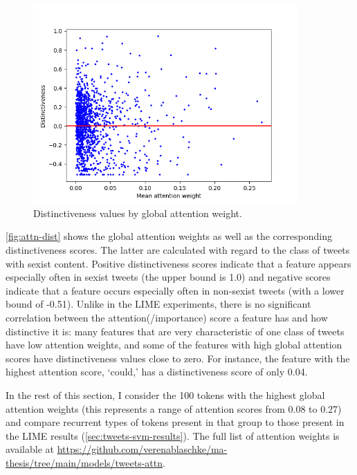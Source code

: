 \begin{figure}[htbp]
    \centering
    \includegraphics[width=0.9\textwidth]{figures/3-dialects/attention-distinctiveness.png}
    \caption[Distinctiveness values by attention weight for features in the Twitter data]{Distinctiveness values by global attention weight.}
    \label{fig:attn-dist}
\end{figure}

\autoref{fig:attn-dist} shows the global attention weights as well as the corresponding distinctiveness scores.
The latter are calculated with regard to the class of tweets with sexist content.
Positive distinctiveness scores indicate that a feature appears especially often in sexist tweets (the upper bound is 1.0) and negative scores indicate that a feature occurs especially often in non-sexist tweets (with a lower bound of -0.51).
Unlike in the LIME experiments, there is no significant correlation between the attention(/importance) score a feature has and how distinctive it is: many features that are very characteristic of one class of tweets have low attention weights, and some of the features with high global attention scores have distinctiveness values close to zero.
For instance, the feature with the highest attention score,  `could,' has a distinctiveness score of only 0.04.

In the rest of this section, I consider the 100 tokens with the highest global attention weights (this represents a range of attention scores from 0.08 to 0.27) and compare recurrent types of tokens present in that group to those present in the LIME results (\autoref{sec:tweets-svm-results}).
The full list of attention weights is available at \url{https://github.com/verenablaschke/ma-thesis/tree/main/models/tweets-attn}.

